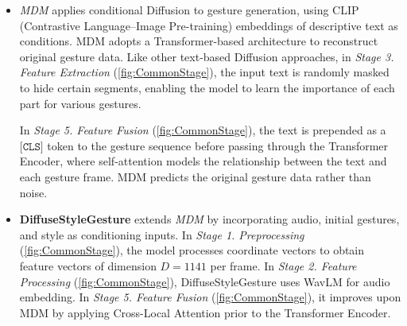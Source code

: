 \begin{itemize}
	\item \textit{MDM} \cite{tevet2022human} applies conditional Diffusion to gesture generation, using CLIP (Contrastive Language–Image Pre-training) embeddings of descriptive text as conditions. MDM adopts a Transformer-based architecture to reconstruct original gesture data. Like other text-based Diffusion approaches, in \textit{Stage 3. Feature Extraction} (\autoref{fig:CommonStage}), the input text is randomly masked to hide certain segments, enabling the model to learn the importance of each part for various gestures. 
	
	In \textit{Stage 5. Feature Fusion} (\autoref{fig:CommonStage}), the text is prepended as a $\texttt{[CLS]}$ token to the gesture sequence before passing through the Transformer Encoder, where self-attention models the relationship between the text and each gesture frame. MDM predicts the original gesture data rather than noise.
	
	\item \textbf{DiffuseStyleGesture} \cite{yang2023diffusestylegesture} extends \textit{MDM} \cite{tevet2022human} by incorporating audio, initial gestures, and style as conditioning inputs. In \textit{Stage 1. Preprocessing} (\autoref{fig:CommonStage}), the model processes coordinate vectors to obtain feature vectors of dimension $D=1141$ per frame. In \textit{Stage 2. Feature Processing} (\autoref{fig:CommonStage}), DiffuseStyleGesture uses WavLM for audio embedding. In \textit{Stage 5. Feature Fusion} (\autoref{fig:CommonStage}), it improves upon MDM by applying Cross-Local Attention prior to the Transformer Encoder.
\end{itemize}
%
%
%
